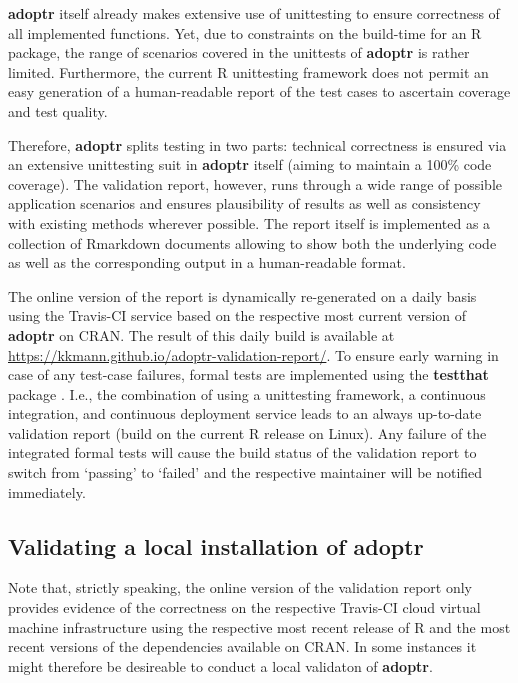 \documentclass[]{book}
\begin{document}
\textbf{adoptr} itself already makes extensive use of unittesting to
ensure correctness of all implemented functions.
Yet, due to constraints on the build-time for an R package,
the range of scenarios covered in the unittests of \textbf{adoptr} is
rather limited.
Furthermore, the current R unittesting framework does not permit
an easy generation of a human-readable report of the test cases
to ascertain coverage and test quality.

Therefore, \textbf{adoptr} splits testing in two parts: technical
correctness is ensured via an extensive unittesting suit in \textbf{adoptr}
itself (aiming to maintain a 100\% code coverage).
The validation report, however, runs through a wide range of possible
application scenarios and ensures plausibility of results as well
as consistency with existing methods wherever possible.
The report itself is implemented as a collection of Rmarkdown documents
allowing to show both the underlying code as well as the corresponding
output in a human-readable format.

The online version of the report is dynamically re-generated on a
daily basis using the Travis-CI service based on the respective
most current version of \textbf{adoptr} on CRAN.
The result of this daily build is available at
\url{https://kkmann.github.io/adoptr-validation-report/}.
To ensure early warning in case of any test-case failures,
formal tests are implemented using the \textbf{testthat} package
\citep{R-testthat}.
I.e., the combination of using a unittesting framework, a continuous
integration, and continuous deployment service leads to an always
up-to-date validation report (build on the current R release on Linux).
Any failure of the integrated formal tests will cause the build status
of the validation report to switch from `passing' to `failed' and
the respective maintainer will be notified immediately.

\hypertarget{validating-a-local-installation-of-adoptr}{%
\subsection{Validating a local installation of adoptr}\label{validating-a-local-installation-of-adoptr}}

Note that, strictly speaking, the online version of the validation
report only provides evidence of the correctness on the respective
Travis-CI cloud virtual machine infrastructure using the respective
most recent release of R and the most recent versions of the
dependencies available on CRAN.
In some instances it might therefore be desireable to conduct a
local validaton of \textbf{adoptr}.
\end{document}
